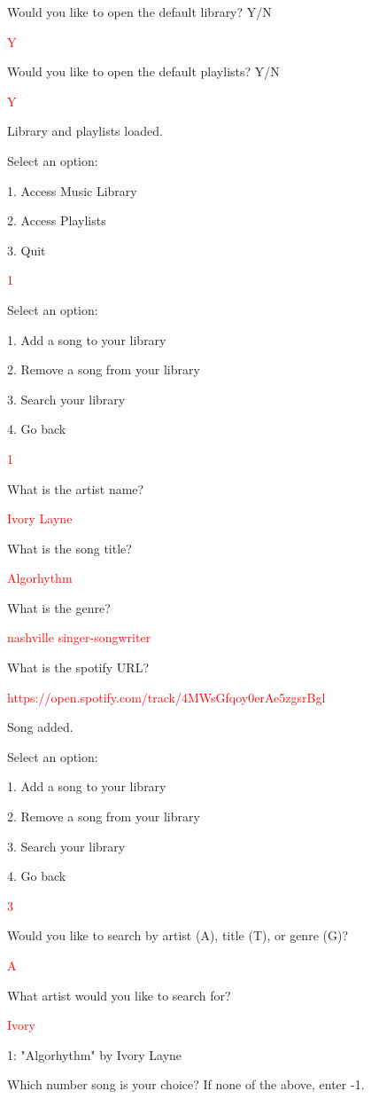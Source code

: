 \begin{sample}
Would you like to open the default library? Y/N

\textcolor{red}{Y}

Would you like to open the default playlists? Y/N

\textcolor{red}{Y}

Library and playlists loaded.

Select an option:

1. Access Music Library

2. Access Playlists

3. Quit

\textcolor{red}{1}

Select an option:

1. Add a song to your library

2. Remove a song from your library

3. Search your library

4. Go back

\textcolor{red}{1}

What is the artist name?

\textcolor{red}{Ivory Layne}

What is the song title?

\textcolor{red}{Algorhythm}

What is the genre?

\textcolor{red}{nashville singer-songwriter}

What is the spotify URL?

\textcolor{red}{https://open.spotify.com/track/4MWsGfqoy0erAe5zgsrBgl}

Song added.

Select an option:

1. Add a song to your library

2. Remove a song from your library

3. Search your library

4. Go back

\textcolor{red}{3}

Would you like to search by artist (A), title (T), or genre (G)?

\textcolor{red}{A}

What artist would you like to search for?

\textcolor{red}{Ivory}

1: "Algorhythm" by Ivory Layne

Which number song is your choice? If none of the above, enter -1.


\end{sample}
